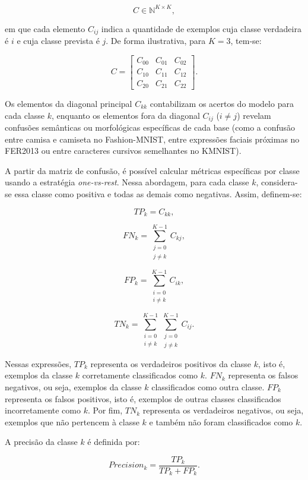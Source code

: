 \documentclass[
    12pt,
    openright,
    oneside,
    a4paper,
    english,
    brazil
]{abntex2}
\begin{document}
\[
C \in \mathbb{N}^{K \times K},
\]

em que cada elemento \(C_{ij}\) indica a quantidade de exemplos cuja classe verdadeira é \(i\) e cuja classe prevista é \(j\). De forma ilustrativa, para \(K=3\), tem-se:

\[
C =
\begin{bmatrix}
C_{00} & C_{01} & C_{02} \\
C_{10} & C_{11} & C_{12} \\
C_{20} & C_{21} & C_{22}
\end{bmatrix}.
\]

Os elementos da diagonal principal \(C_{kk}\) contabilizam os acertos do modelo para cada classe \(k\), enquanto os elementos fora da diagonal \(C_{ij}\) (\(i \neq j\)) revelam confusões semânticas ou morfológicas específicas de cada base (como a confusão entre camisa e camiseta no Fashion-MNIST, entre expressões faciais próximas no FER2013 ou entre caracteres cursivos semelhantes no KMNIST).

A partir da matriz de confusão, é possível calcular métricas específicas por classe usando a estratégia \textit{one-vs-rest}. Nessa abordagem, para cada classe \(k\), considera-se essa classe como positiva e todas as demais como negativas. Assim, definem-se:

\[
TP_k = C_{kk},
\]

\[
FN_k =
\sum_{\substack{j=0 \\ j \neq k}}^{K-1}
C_{kj},
\]

\[
FP_k =
\sum_{\substack{i=0 \\ i \neq k}}^{K-1}
C_{ik},
\]

\[
TN_k =
\sum_{\substack{i=0 \\ i \neq k}}^{K-1}
\sum_{\substack{j=0 \\ j \neq k}}^{K-1}
C_{ij}.
\]

Nessas expressões, \(TP_k\) representa os verdadeiros positivos da classe \(k\), isto é, exemplos da classe \(k\) corretamente classificados como \(k\). \(FN_k\) representa os falsos negativos, ou seja, exemplos da classe \(k\) classificados como outra classe. \(FP_k\) representa os falsos positivos, isto é, exemplos de outras classes classificados incorretamente como \(k\). Por fim, \(TN_k\) representa os verdadeiros negativos, ou seja, exemplos que não pertencem à classe \(k\) e também não foram classificados como \(k\).

A precisão da classe \(k\) é definida por:

\[
Precision_k =
\frac{TP_k}{TP_k + FP_k}.
\]
\end{document}
